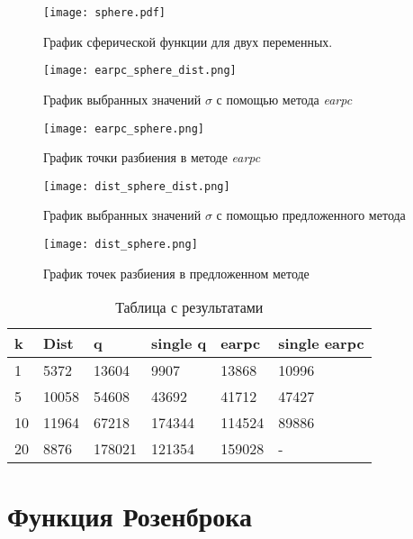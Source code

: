 \begin{figure}
    \centering
    \texttt{[image: sphere.pdf]}
    \caption{График сферической функции для двух переменных.}
    \label{sphere_plot}
\end{figure}

\begin{figure}
    \centering
    \label{earpc_sphere_dist}
    \texttt{[image: earpc\_sphere\_dist.png]}
    \caption{График выбранных значений $\sigma$ с помощью метода \textit{earpc}}
\end{figure}


\begin{figure}
\label{earpc_sphere}
    \centering
    \texttt{[image: earpc\_sphere.png]}
    \caption{График точки разбиения в методе \textit{earpc}}
\end{figure}

\begin{figure}
\label{dist_sphere}
    \centering
    \texttt{[image: dist\_sphere\_dist.png]}
    \caption{График выбранных значений $\sigma$ с помощью предложенного метода}
\end{figure}

\begin{figure}
    \centering
    \texttt{[image: dist\_sphere.png]}
    \caption{График точек разбиения в предложенном методе}
\end{figure}


\begin{table}
\label{sphere_results}
  \centering
  \begin{tabular}{|l|l|l|l|l|l|}
    \hline
    k & Dist & q & single q & earpc & single earpc\\
    \hline
    1 & 5372 & 13604 & 9907 & 13868 & 10996 \\
    \hline
    5 & 10058 & 54608 & 43692 & 41712 & 47427 \\
    \hline
    10 & 11964 & 67218 & 174344 & 114524 & 89886 \\
    \hline
    20 & 8876 & 178021 & 121354 & 159028 & - \\
    \hline
  \end{tabular}
  \captionsetup{justification=centering}
    \caption{Таблица с результатами}
\end{table}


\section{Функция Розенброка}


